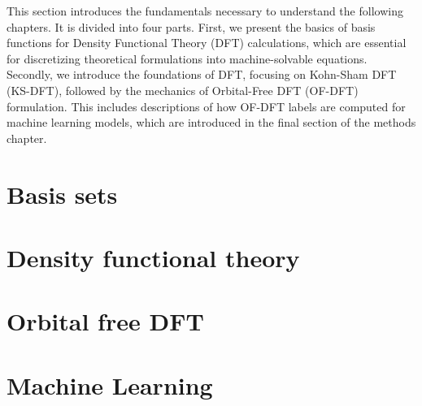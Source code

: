 This section introduces the fundamentals necessary to understand the following chapters. It is divided into four parts. First, we present the basics of basis functions for Density Functional Theory (DFT) calculations, which are essential for discretizing theoretical formulations into machine-solvable equations. Secondly, we introduce the foundations of DFT, focusing on Kohn-Sham DFT (KS-DFT), followed by the mechanics of Orbital-Free DFT (OF-DFT) formulation. This includes descriptions of how OF-DFT labels are computed for machine learning models, which are introduced in the final section of the methods chapter.
\section{Basis sets}

\section{Density functional theory}

\section{Orbital free DFT}

\section{Machine Learning}
